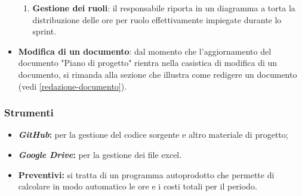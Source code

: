 \begin{itemize}
\begin{enumerate}
		      \item \textbf{Gestione dei ruoli}: il responsabile riporta in
		            un diagramma a torta la distribuzione delle ore per ruolo
		            effettivamente impiegate durante lo sprint.
	      \end{enumerate}

	\item \textbf{Modifica di un documento}: dal momento che
	      l'aggiornamento del documento "Piano di progetto" rientra nella
	      casistica di modifica di un documento, si rimanda alla sezione
	      che illustra come redigere un documento (vedi
	      \ref{redazione-documento}).
\end{itemize}

\subsubsection{Strumenti}
\begin{itemize}
	\item \textbf{\textit{GitHub}:} per la gestione del codice sorgente e altro
	      materiale di progetto;

	\item \textbf{\textit{Google Drive}:} per la gestione dei file excel.

	\item \textbf{Preventivi:} si tratta di un programma autoprodotto che
	      permette di calcolare in modo automatico le ore e i costi totali per
	      il periodo.
\end{itemize}
